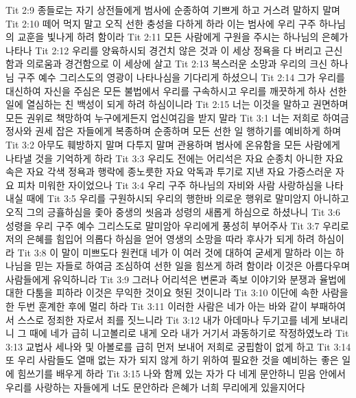 Tit 2:9  종들로는 자기 상전들에게 범사에 순종하여 기쁘게 하고 거스려 말하지 말며
Tit 2:10  떼어 먹지 말고 오직 선한 충성을 다하게 하라 이는 범사에 우리 구주 하나님의 교훈을 빛나게 하려 함이라
Tit 2:11  모든 사람에게 구원을 주시는 하나님의 은혜가 나타나
Tit 2:12  우리를 양육하시되 경건치 않은 것과 이 세상 정욕을 다 버리고 근신함과 의로움과 경건함으로 이 세상에 살고
Tit 2:13  복스러운 소망과 우리의 크신 하나님 구주 예수 그리스도의 영광이 나타나심을 기다리게 하셨으니
Tit 2:14  그가 우리를 대신하여 자신을 주심은 모든 불법에서 우리를 구속하시고 우리를 깨끗하게 하사 선한 일에 열심하는 친 백성이 되게 하려 하심이니라
Tit 2:15  너는 이것을 말하고 권면하며 모든 권위로 책망하여 누구에게든지 업신여김을 받지 말라
Tit 3:1  너는 저희로 하여금 정사와 권세 잡은 자들에게 복종하며 순종하며 모든 선한 일 행하기를 예비하게 하며
Tit 3:2  아무도 훼방하지 말며 다투지 말며 관용하며 범사에 온유함을 모든 사람에게 나타낼 것을 기억하게 하라
Tit 3:3  우리도 전에는 어리석은 자요 순종치 아니한 자요 속은 자요 각색 정욕과 행락에 종노릇한 자요 악독과 투기로 지낸 자요 가증스러운 자요 피차 미워한 자이었으나
Tit 3:4  우리 구주 하나님의 자비와 사람 사랑하심을 나타내실 때에
Tit 3:5  우리를 구원하시되 우리의 행한바 의로운 행위로 말미암지 아니하고 오직 그의 긍휼하심을 좇아 중생의 씻음과 성령의 새롭게 하심으로 하셨나니
Tit 3:6  성령을 우리 구주 예수 그리스도로 말미암아 우리에게 풍성히 부어주사
Tit 3:7  우리로 저의 은혜를 힘입어 의롭다 하심을 얻어 영생의 소망을 따라 후사가 되게 하려 하심이라
Tit 3:8  이 말이 미쁘도다 원컨대 네가 이 여러 것에 대하여 굳세게 말하라 이는 하나님을 믿는 자들로 하여금 조심하여 선한 일을 힘쓰게 하려 함이라 이것은 아름다우며 사람들에게 유익하니라
Tit 3:9  그러나 어리석은 변론과 족보 이야기와 분쟁과 율법에 대한 다툼을 피하라 이것은 무익한 것이요 헛된 것이니라
Tit 3:10  이단에 속한 사람을 한 두번 훈계한 후에 멀리 하라
Tit 3:11  이러한 사람은 네가 아는 바와 같이 부패하여서 스스로 정죄한 자로서 죄를 짓느니라
Tit 3:12  내가 아데마나 두기고를 네게 보내리니 그 때에 네가 급히 니고볼리로 내게 오라 내가 거기서 과동하기로 작정하였노라
Tit 3:13  교법사 세나와 및 아볼로를 급히 먼저 보내어 저희로 궁핍함이 없게 하고
Tit 3:14  또 우리 사람들도 열매 없는 자가 되지 않게 하기 위하여 필요한 것을 예비하는 좋은 일에 힘쓰기를 배우게 하라
Tit 3:15  나와 함께 있는 자가 다 네게 문안하니 믿음 안에서 우리를 사랑하는 자들에게 너도 문안하라 은혜가 너희 무리에게 있을지어다


